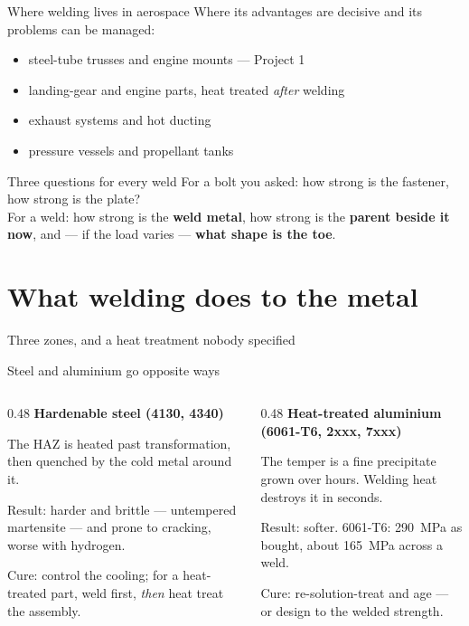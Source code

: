 \documentclass[aspectratio=169,10pt]{beamer}
\begin{document}
\begin{frame}{Where welding lives in aerospace}
Where its advantages are decisive and its problems can be managed:
\begin{itemize}
  \item steel-tube trusses and \alert{engine mounts} --- Project 1
  \item landing-gear and engine parts, heat treated \emph{after} welding
  \item exhaust systems and hot ducting
  \item pressure vessels and propellant tanks
\end{itemize}
\vfill
\begin{block}{Three questions for every weld}
For a bolt you asked: how strong is the fastener, how strong is the plate?\\
For a weld: how strong is the \textbf{weld metal}, how strong is the \textbf{parent beside it now},
and --- if the load varies --- \textbf{what shape is the toe}.
\end{block}
\end{frame}

\section{What welding does to the metal}

\begin{frame}{Three zones, and a heat treatment nobody specified}
\centering
\resizebox{!}{0.78\textheight}{}
\end{frame}

\begin{frame}{Steel and aluminium go opposite ways}
\begin{columns}[T]
\begin{column}{0.48\textwidth}
\textbf{Hardenable steel (4130, 4340)}

\medskip
The HAZ is heated past transformation, then quenched by the cold metal around it.

\medskip
Result: \alert{harder and brittle} --- untempered martensite --- and prone to cracking, worse with
hydrogen.

\medskip
Cure: control the cooling; for a heat-treated part, weld first, \emph{then} heat treat the assembly.
\end{column}
\begin{column}{0.48\textwidth}
\textbf{Heat-treated aluminium (6061-T6, 2xxx, 7xxx)}

\medskip
The temper is a fine precipitate grown over hours. Welding heat destroys it in seconds.

\medskip
Result: \alert{softer}. 6061-T6: \SI{290}{MPa} as bought, about \SI{165}{MPa} across a weld.

\medskip
Cure: re-solution-treat and age --- or design to the welded strength.
\end{column}
\end{columns}
\end{frame}
\end{document}
